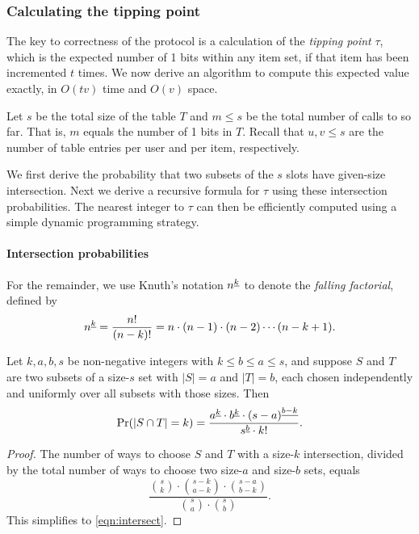 \subsubsection{Calculating the tipping point}

The key to correctness of the \TestCount{} protocol is a calculation of the \emph{tipping point} $\tau$, which is the expected number of 1 bits within any item set, if that item has been incremented $t$ times. We now derive an algorithm to compute this expected value exactly, in $O(tv)$ time and $O(v)$ space.

Let $s$ be the total size of the table $T$ and $m\le s$ be the total number of calls to \Increment{} so far. That is, $m$ equals the number of 1 bits in $T$.
Recall that $u,v \le s$ are the number of table entries per user and per item, respectively.

We first derive the probability that two subsets of the $s$ slots have given-size intersection.
Next we derive a recursive formula for $\tau$ using these intersection probabilities.
The nearest integer to $\tau$ can then be efficiently computed using a simple dynamic
programming strategy.

\paragraph{Intersection probabilities}

For the remainder, we use Knuth's notation ${n}^{\underline{k}}$ to denote the \emph{falling factorial},
defined by
\[{n}^{\underline{k}} = \frac{n!}{(n-k)!} = n\cdot(n-1)\cdot(n-2)\cdots(n-k+1).\]

\begin{lemma}\label{lem:intersect}
Let $k,a,b,s$ be non-negative integers with $k \le b \le a \le s$, and
suppose $S$ and $T$ are two subsets of a size-$s$ set with $|S|=a$ and $|T|=b$, each
chosen independently and uniformly over all subsets with those sizes. Then
\begin{equation}\label{eqn:intersect}
\Pr(|S \cap T| = k) = 
    \frac{{a}^{\underline{k}} \cdot{} {b}^{\underline{k}} \cdot{} {(s-a)}^{\underline{b-k}}}
         {{s}^{\underline{b}} \cdot{} k!}.
\end{equation}
\end{lemma}
\begin{proof}
The number of ways to choose $S$ and $T$ with a size-$k$ intersection, divided
by the total number of ways to choose two size-$a$ and size-$b$ sets, equals
\[\frac{\binom{s}{k} \cdot{} \binom{s-k}{a-k} \cdot{} \binom{s-a}{b-k}}
{\binom{s}{a}\cdot{}\binom{s}{b}}.\]
This simplifies to \eqref{eqn:intersect}.
\end{proof}

